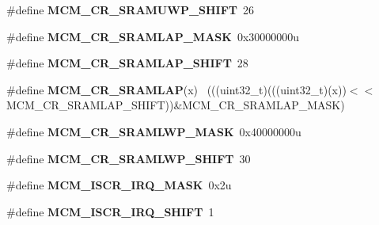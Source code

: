 \begin{DoxyCompactItemize}
\item 
\hypertarget{group___m_c_m___register___masks_ga73c2b0e8ecdcd2a07070c863db3e9fcd}{}\#define {\bfseries M\+C\+M\+\_\+\+C\+R\+\_\+\+S\+R\+A\+M\+U\+W\+P\+\_\+\+S\+H\+I\+F\+T}~26\label{group___m_c_m___register___masks_ga73c2b0e8ecdcd2a07070c863db3e9fcd}

\item 
\hypertarget{group___m_c_m___register___masks_gad9a5f5487e03cefac1a4798ccce630bc}{}\#define {\bfseries M\+C\+M\+\_\+\+C\+R\+\_\+\+S\+R\+A\+M\+L\+A\+P\+\_\+\+M\+A\+S\+K}~0x30000000u\label{group___m_c_m___register___masks_gad9a5f5487e03cefac1a4798ccce630bc}

\item 
\hypertarget{group___m_c_m___register___masks_ga083d0b4e4188e656d92bfa8fb9b4eca9}{}\#define {\bfseries M\+C\+M\+\_\+\+C\+R\+\_\+\+S\+R\+A\+M\+L\+A\+P\+\_\+\+S\+H\+I\+F\+T}~28\label{group___m_c_m___register___masks_ga083d0b4e4188e656d92bfa8fb9b4eca9}

\item 
\hypertarget{group___m_c_m___register___masks_ga264b34607cdb5067dbc84ea7f2558d29}{}\#define {\bfseries M\+C\+M\+\_\+\+C\+R\+\_\+\+S\+R\+A\+M\+L\+A\+P}(x)                                            ~(((uint32\+\_\+t)(((uint32\+\_\+t)(x))$<$$<$M\+C\+M\+\_\+\+C\+R\+\_\+\+S\+R\+A\+M\+L\+A\+P\+\_\+\+S\+H\+I\+F\+T))\&M\+C\+M\+\_\+\+C\+R\+\_\+\+S\+R\+A\+M\+L\+A\+P\+\_\+\+M\+A\+S\+K)\label{group___m_c_m___register___masks_ga264b34607cdb5067dbc84ea7f2558d29}

\item 
\hypertarget{group___m_c_m___register___masks_ga93830e2785e77585febe87f0bc83da5c}{}\#define {\bfseries M\+C\+M\+\_\+\+C\+R\+\_\+\+S\+R\+A\+M\+L\+W\+P\+\_\+\+M\+A\+S\+K}~0x40000000u\label{group___m_c_m___register___masks_ga93830e2785e77585febe87f0bc83da5c}

\item 
\hypertarget{group___m_c_m___register___masks_ga7c3a04f9ed4a8824e212536c1d783fea}{}\#define {\bfseries M\+C\+M\+\_\+\+C\+R\+\_\+\+S\+R\+A\+M\+L\+W\+P\+\_\+\+S\+H\+I\+F\+T}~30\label{group___m_c_m___register___masks_ga7c3a04f9ed4a8824e212536c1d783fea}

\item 
\hypertarget{group___m_c_m___register___masks_ga86ab0b13f7c720c3b9ad33950745d05d}{}\#define {\bfseries M\+C\+M\+\_\+\+I\+S\+C\+R\+\_\+\+I\+R\+Q\+\_\+\+M\+A\+S\+K}~0x2u\label{group___m_c_m___register___masks_ga86ab0b13f7c720c3b9ad33950745d05d}

\item 
\hypertarget{group___m_c_m___register___masks_ga68080cbb94f82b92990da0f06b9e1fe2}{}\#define {\bfseries M\+C\+M\+\_\+\+I\+S\+C\+R\+\_\+\+I\+R\+Q\+\_\+\+S\+H\+I\+F\+T}~1\label{group___m_c_m___register___masks_ga68080cbb94f82b92990da0f06b9e1fe2}


\end{DoxyCompactItemize}
